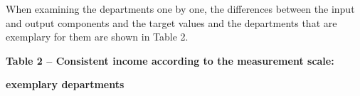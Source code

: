 When examining the departments one by one, the differences between the
input and output components and the target values
\hspace{0pt}\hspace{0pt}and the departments that are exemplary for them
are shown in Table 2.

{\bfseries Table 2 -- Consistent income according to the measurement scale:}

{\bfseries exemplary departments}

